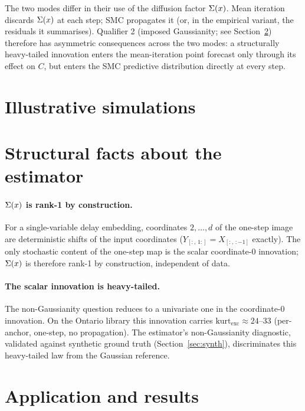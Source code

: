 The two modes differ in their use of the diffusion factor \(\Sigma(x)\).
Mean iteration discards \(\Sigma(x)\) at each step; SMC propagates it
(or, in the empirical variant, the residuals it summarises).
Qualifier 2 (imposed Gaussianity; see Section~\ref{sec:caveat})
therefore has asymmetric consequences across the two modes: a
structurally heavy-tailed innovation enters the mean-iteration point
forecast only through its effect on \(C\), but enters the SMC
predictive distribution directly at every step.

\section{Illustrative simulations}
\label{sec:illustrations}


\section{Structural facts about the estimator}
\label{sec:caveat}

\paragraph{\(\Sigma(x)\) is rank-1 by construction.} For a single-variable
delay embedding, coordinates \(2, \ldots, d\) of the one-step image
are deterministic shifts of the input coordinates
(\(Y_{[:,\,1:]} = X_{[:,\,:-1]}\) exactly). The only stochastic
content of the one-step map is the scalar coordinate-0 innovation;
\(\Sigma(x)\) is therefore rank-1 by construction, independent of data.

\paragraph{The scalar innovation is heavy-tailed.} The
non-Gaussianity question reduces to a univariate one in the
coordinate-0 innovation. On the Ontario library this innovation
carries \(\mathrm{kurt}_{\mathrm{exc}} \approx 24\)--\(33\)
(per-anchor, one-step, no propagation). The estimator's
non-Gaussianity diagnostic, validated against synthetic ground truth
(Section~\ref{sec:synth}), discriminates this heavy-tailed law from
the Gaussian reference.

\section{Application and results}
\label{sec:application}

